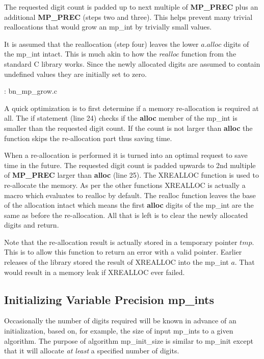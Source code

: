 \documentclass[b5paper]{book}
\begin{document}
The requested digit count is padded up to next multiple of \textbf{MP\_PREC} plus an additional \textbf{MP\_PREC} (steps two and three).  
This helps prevent many trivial reallocations that would grow an mp\_int by trivially small values.  

It is assumed that the reallocation (step four) leaves the lower $a.alloc$ digits of the mp\_int intact.  This is much 
akin to how the \textit{realloc} function from the standard C library works.  Since the newly allocated digits are 
assumed to contain undefined values they are initially set to zero.

\vspace{+3mm}\begin{small}
\hspace{-5.1mm}{\bf File}: bn\_mp\_grow.c
\vspace{-3mm}
\begin{alltt}
\end{alltt}
\end{small}

A quick optimization is to first determine if a memory re-allocation is required at all.  The if statement (line 24) checks
if the \textbf{alloc} member of the mp\_int is smaller than the requested digit count.  If the count is not larger than \textbf{alloc}
the function skips the re-allocation part thus saving time.

When a re-allocation is performed it is turned into an optimal request to save time in the future.  The requested digit count is
padded upwards to 2nd multiple of \textbf{MP\_PREC} larger than \textbf{alloc} (line 25).  The XREALLOC function is used
to re-allocate the memory.  As per the other functions XREALLOC is actually a macro which evaluates to realloc by default.  The realloc
function leaves the base of the allocation intact which means the first \textbf{alloc} digits of the mp\_int are the same as before
the re-allocation.  All	that is left is to clear the newly allocated digits and return.

Note that the re-allocation result is actually stored in a temporary pointer $tmp$.  This is to allow this function to return
an error with a valid pointer.  Earlier releases of the library stored the result of XREALLOC into the mp\_int $a$.  That would
result in a memory leak if XREALLOC ever failed.  

\subsection{Initializing Variable Precision mp\_ints}
Occasionally the number of digits required will be known in advance of an initialization, based on, for example, the size 
of input mp\_ints to a given algorithm.  The purpose of algorithm mp\_init\_size is similar to mp\_init except that it 
will allocate \textit{at least} a specified number of digits.  
\end{document}
